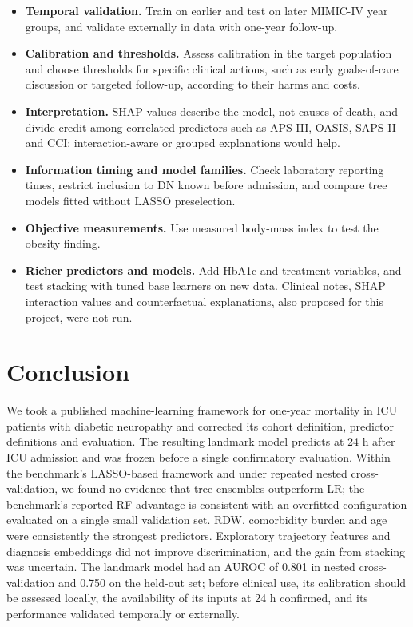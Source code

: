 \begin{itemize}
\tightlist
\item
  \textbf{Temporal validation.} Train on earlier and test on later MIMIC-IV year
  groups, and validate externally in data with one-year follow-up.
\item
  \textbf{Calibration and thresholds.} Assess calibration in the target
  population and choose thresholds for specific clinical actions, such as early
  goals-of-care discussion or targeted follow-up, according to their harms and
  costs.
\item
  \textbf{Interpretation.} SHAP values describe the model, not causes of death,
  and divide credit among correlated predictors such as APS-III, OASIS, SAPS-II
  and CCI; interaction-aware or grouped explanations would help.
\item
  \textbf{Information timing and model families.} Check laboratory reporting
  times, restrict inclusion to DN known before admission, and compare tree
  models fitted without LASSO preselection.
\item
  \textbf{Objective measurements.} Use measured body-mass index to test the
  obesity finding.
\item
  \textbf{Richer predictors and models.} Add HbA1c and treatment variables, and
  test stacking with tuned base learners on new data. Clinical notes, SHAP
  interaction values and counterfactual explanations, also proposed for this
  project, were not run.
\end{itemize}

\hypertarget{conclusion}{%
\section{Conclusion}\label{conclusion}}

We took a published machine-learning framework for one-year mortality in ICU
patients with diabetic neuropathy and corrected its cohort definition, predictor
definitions and evaluation. The resulting landmark model predicts at 24 h after
ICU admission and was frozen before a single confirmatory evaluation. Within the
benchmark's LASSO-based framework and under repeated nested cross-validation, we
found no evidence that tree ensembles outperform LR; the benchmark's reported RF
advantage is consistent with an overfitted configuration evaluated on a single
small validation set. RDW, comorbidity burden and age were consistently the
strongest predictors. Exploratory trajectory features and diagnosis embeddings
did not improve discrimination, and the gain from stacking was uncertain. The
landmark model had an AUROC of 0.801 in nested cross-validation and 0.750 on the
held-out set; before clinical use, its calibration should be assessed locally,
the availability of its inputs at 24 h confirmed, and its performance validated
temporally or externally.

